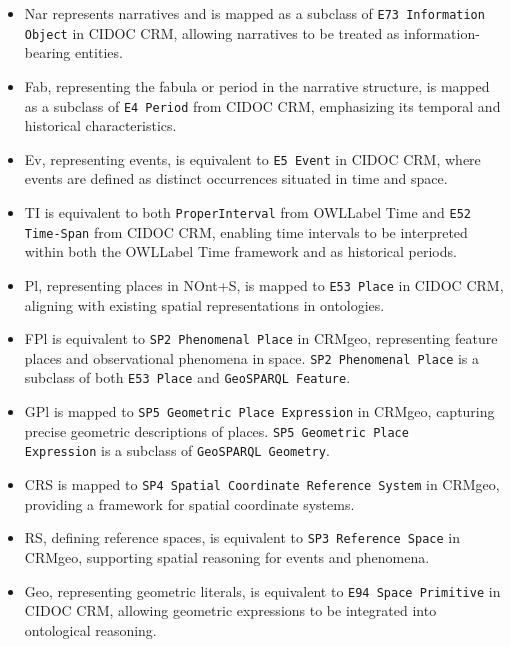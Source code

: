 \begin{itemize}
    \item \textsf{Nar} represents narratives and is mapped as a subclass of \texttt{E73 Information Object} in CIDOC CRM, allowing narratives to be treated as information-bearing entities.
    
    \item \textsf{Fab}, representing the fabula or period in the narrative structure, is mapped as a subclass of \texttt{E4 Period} from CIDOC CRM, emphasizing its temporal and historical characteristics.
    
    \item \textsf{Ev}, representing events, is equivalent to \texttt{E5 Event} in CIDOC CRM, where events are defined as distinct occurrences situated in time and space.
    
    \item \textsf{TI} is equivalent to both \texttt{ProperInterval} from \acrshort{OWLLabel} Time and \texttt{E52 Time-Span} from CIDOC CRM, enabling time intervals to be interpreted within both the \acrshort{OWLLabel} Time framework and as historical periods.
    
    \item \textsf{Pl}, representing places in NOnt+S, is mapped to \texttt{E53 Place} in CIDOC CRM, aligning with existing spatial representations in ontologies.
    
    \item \textsf{FPl} is equivalent to \texttt{SP2 Phenomenal Place} in CRMgeo, representing feature places and observational phenomena in space. \texttt{SP2 Phenomenal Place} is a subclass of both \texttt{E53 Place} and \texttt{GeoSPARQL Feature}.
    
    \item \textsf{GPl} is mapped to \texttt{SP5 Geometric Place Expression} in CRMgeo, capturing precise geometric descriptions of places. \texttt{SP5 Geometric Place \\Expression} is a subclass of \texttt{GeoSPARQL Geometry}.
    
    \item \textsf{CRS} is mapped to \texttt{SP4 Spatial Coordinate Reference System} in CRMgeo, providing a framework for spatial coordinate systems.
    
    \item \textsf{RS}, defining reference spaces, is equivalent to \texttt{SP3 Reference Space} in CRMgeo, supporting spatial reasoning for events and phenomena.
    
    \item \textsf{Geo}, representing geometric literals, is equivalent to \texttt{E94 Space Primitive} in CIDOC CRM, allowing geometric expressions to be integrated into ontological reasoning.
\end{itemize}

